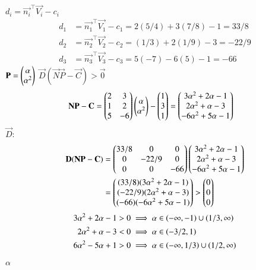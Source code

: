 \documentclass[journal,12pt,onecolumn]{IEEEtran}
\theoremstyle{remark}
\begin{document}
 $d_i = \vec{n_i}^\top\vec{V_i}-c_i$ 
\begin{align}
 d_1 &= \vec{n_1}^\top\vec{V_1}-c_1 = 2(5/4) + 3(7/8) - 1 = 33/8 \\
 d_2 &= \vec{n_2}^\top\vec{V_2}-c_2 = (1/3) + 2(1/9) - 3 = -22/9 \\
 d_3 &= \vec{n_3}^\top\vec{V_3}-c_3 = 5(-7) - 6(5) - 1 = -66
\end{align}
 $\mathbf{P} = \begin{pmatrix}\alpha \\ \alpha^2\end{pmatrix}$  $\vec{D}(\vec{N}\vec{P}-\vec{C}) > \vec{0}$ 
\begin{align}
 \mathbf{N}\mathbf{P}-\mathbf{C} &= \begin{pmatrix}2 & 3 \\ 1 & 2 \\ 5 & -6\end{pmatrix} \begin{pmatrix}\alpha \\ \alpha^2\end{pmatrix} - \begin{pmatrix}1 \\ 3 \\ 1\end{pmatrix} = \begin{pmatrix}3\alpha^2+2\alpha-1 \\ 2\alpha^2+\alpha-3 \\ -6\alpha^2+5\alpha-1\end{pmatrix}
\end{align}
 $\vec{D}$:
\begin{align}
 \mathbf{D}(\mathbf{N}\mathbf{P}-\mathbf{C}) &= \begin{pmatrix}33/8 & 0 & 0 \\ 0 & -22/9 & 0 \\ 0 & 0 & -66\end{pmatrix} \begin{pmatrix}3\alpha^2+2\alpha-1 \\ 2\alpha^2+\alpha-3 \\ -6\alpha^2+5\alpha-1\end{pmatrix} \\
 &= \begin{pmatrix}(33/8)(3\alpha^2+2\alpha-1) \\ (-22/9)(2\alpha^2+\alpha-3) \\ (-66)(-6\alpha^2+5\alpha-1)\end{pmatrix} > \begin{pmatrix}0 \\ 0 \\ 0\end{pmatrix}
\end{align}
\begin{align}
 3\alpha^2+2\alpha-1 &> 0 \implies \alpha \in \left(-\infty, -1\right) \cup \left(1/3, \infty\right) \\
 2\alpha^2+\alpha-3 &< 0 \implies \alpha \in \left(-3/2, 1\right) \\
 6\alpha^2-5\alpha+1 &> 0 \implies \alpha \in \left(-\infty, 1/3\right) \cup \left(1/2, \infty\right)
\end{align}
 $\alpha$ 
\end{document}
